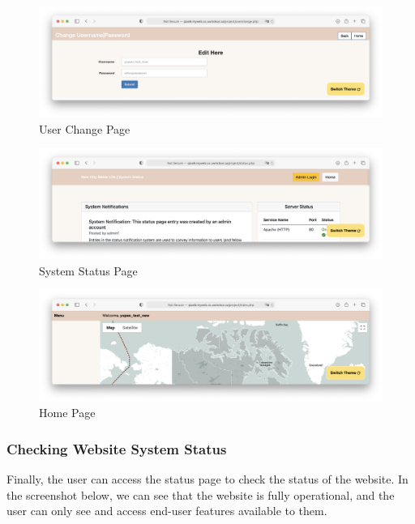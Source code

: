 \documentclass[12pt, letterpaper]{article}
\begin{document}
\begin{figure}[htbp]
	\centering
	\includegraphics[width=5in]{images/30-journey-e08a.png}
	\caption{User Change Page}
 \end{figure}

 \begin{figure}[htbp]
	\centering
	\includegraphics[width=5in]{images/30-journey-e08b.png}
	\caption{System Status Page}
 \end{figure}

 \begin{figure}[htbp]
	\centering
	\includegraphics[width=5in]{images/30-journey-e08c.png}
	\caption{Home Page}
 \end{figure}

 \newpage
 \subsubsection*{Checking Website System Status}
Finally, the user can access the status page to check the status of the website. In the screenshot below, we can see that the website is fully operational, and the user can only see and access end-user features available to them.
\end{document}
